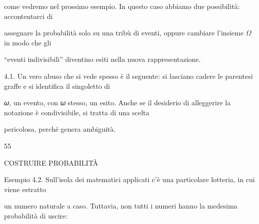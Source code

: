 \documentclass[a4paper,portrait,12pt]{article}
\begin{document}
\begin{flushleft}
come vedremo nel prossimo esempio. In questo caso abbiamo due possibilit\`{a}: accontentarci di
\end{flushleft}


\begin{flushleft}
assegnare la probabilit\`{a} solo su una tribù di eventi, oppure cambiare l'insieme $\Omega$ in modo che gli
\end{flushleft}


\begin{flushleft}
{``}eventi indivisibili'' diventino esiti nella nuova rappresentazione.
\end{flushleft}


\begin{flushleft}
4.1. Un vero abuso che si vede spesso \`{e} il seguente: si lasciano cadere le parentesi graffe e si identifica il singoletto di
\end{flushleft}


\begin{flushleft}
𝜔, un evento, con 𝜔 stesso, un esito. Anche se il desiderio di alleggerire la notazione \`{e} condivisibile, si tratta di una scelta
\end{flushleft}


\begin{flushleft}
pericolosa, perch\'{e} genera ambiguit\`{a}.
\end{flushleft}





55










\begin{flushleft}
COSTRUIRE PROBABILIT\`{A}
\end{flushleft}





\begin{flushleft}
Esempio 4.2. Sull'isola dei matematici applicati c'\`{e} una particolare lotteria, in cui viene estratto
\end{flushleft}


\begin{flushleft}
un numero naturale a caso. Tuttavia, non tutti i numeri hanno la medesima probabilit\`{a} di uscire:
\end{flushleft}
\end{document}
